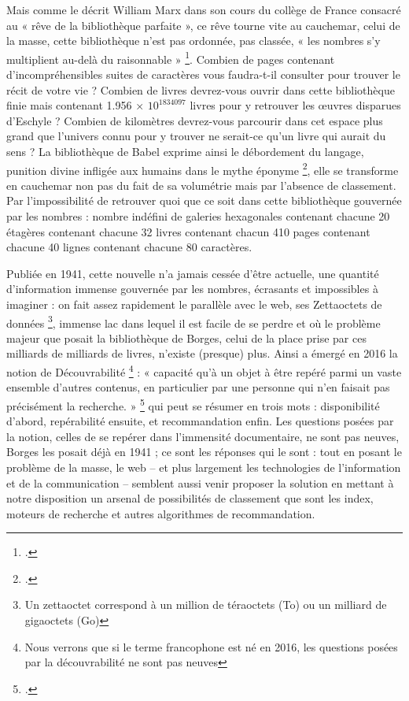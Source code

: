 \documentclass[a4paper,12pt,twoside]{book}
\begin{document}
	Mais comme le décrit William Marx dans son cours du collège de France consacré au « rêve de la bibliothèque parfaite », ce rêve tourne vite au cauchemar, celui de la masse, cette bibliothèque n’est pas ordonnée, pas classée, « les nombres s’y multiplient au-delà du raisonnable » \footcite{marx}. Combien de pages contenant d’incompréhensibles suites de caractères vous faudra-t-il consulter pour trouver le récit de votre vie ? Combien de livres devrez-vous ouvrir dans cette bibliothèque finie mais contenant 1.956 × $10^{1834097}$ livres pour y retrouver les œuvres disparues d’Eschyle ? Combien de kilomètres devrez-vous parcourir dans cet espace plus grand que l’univers connu pour y trouver ne serait-ce qu’un livre qui aurait du sens ? La bibliothèque de Babel exprime ainsi le débordement du langage, punition divine infligée aux humains dans le mythe éponyme \footcite{zotero-393}, elle se transforme en cauchemar non pas du fait de sa volumétrie mais par l’absence de classement. Par l’impossibilité de retrouver quoi que ce soit dans cette bibliothèque gouvernée par les nombres : nombre indéfini de galeries hexagonales contenant chacune 20 étagères contenant chacune 32 livres contenant chacun 410 pages contenant chacune 40 lignes contenant chacune 80 caractères.
	
	Publiée en 1941, cette nouvelle n’a jamais cessée d’être actuelle, une quantité d’information immense gouvernée par les nombres, écrasants et impossibles à imaginer : on fait assez rapidement le parallèle avec le web, ses Zettaoctets de données \footnote{Un zettaoctet correspond à un million de téraoctets (To) ou un milliard de gigaoctets (Go)}, immense lac dans lequel il est facile de se perdre et où le problème majeur que posait la bibliothèque de Borges, celui de la place prise par ces milliards de milliards de livres, n’existe (presque) plus. Ainsi a émergé en 2016 la notion de Découvrabilité \footnote{Nous verrons que si le terme francophone est né en 2016, les questions posées par la découvrabilité ne sont pas neuves} : « capacité qu’à un objet à être repéré parmi un vaste ensemble d’autres contenus, en particulier par une personne qui n’en faisait pas précisément la recherche. » \footcite{zotero-263} qui peut se résumer en trois mots : disponibilité d’abord, repérabilité ensuite, et recommandation enfin. Les questions posées par la notion, celles de se repérer dans l’immensité documentaire, ne sont pas neuves, Borges les posait déjà en 1941 ; ce sont les réponses qui le sont : tout en posant le problème de la masse, le web – et plus largement les technologies de l’information et de la communication – semblent aussi venir proposer la solution en mettant à notre disposition un arsenal de possibilités de classement que sont les index, moteurs de recherche et autres algorithmes de recommandation.
	
\end{document}
